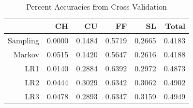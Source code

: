 \begin{table}[ht]
\centering
\begin{tabular}{rrrrrr}
  \hline
 & CH & CU & FF & SL & Total \\ 
  \hline
Sampling & 0.0000 & 0.1484 & 0.5719 & 0.2665 & 0.4183 \\ 
  Markov & 0.0515 & 0.1420 & 0.5647 & 0.2616 & 0.4188 \\ 
  LR1 & 0.0140 & 0.2884 & 0.6392 & 0.2972 & 0.4873 \\ 
  LR2 & 0.0444 & 0.3029 & 0.6342 & 0.3062 & 0.4902 \\ 
  LR3 & 0.0478 & 0.2893 & 0.6347 & 0.3159 & 0.4949 \\ 
   \hline
\end{tabular}
\caption{Percent Accuracies from Cross Validation} 
\end{table}

